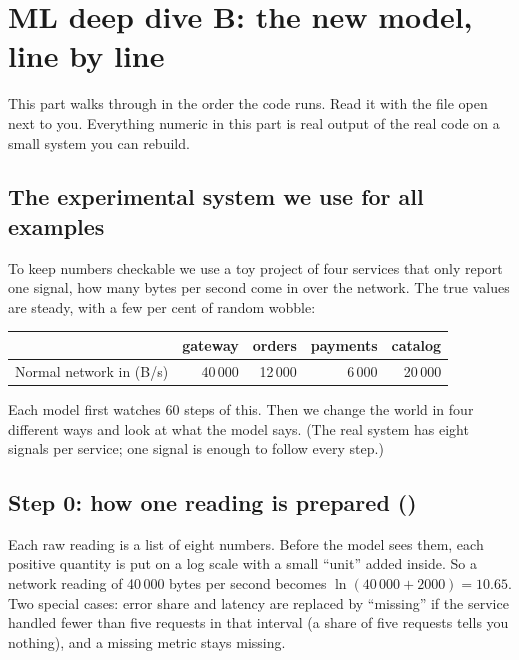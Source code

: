 \chapter{ML deep dive B: the new model, line by line}
\label{ch:deepload}

This part walks through  in the order the code runs. Read it with the file open next to you. Everything numeric in this part is real output of the real code on a small system you can rebuild.

\section{The experimental system we use for all examples}
\begin{simplebox}
To keep numbers checkable we use a toy project of four services that only report one signal, how many bytes per second come in over the network. The true values are steady, with a few per cent of random wobble:

\begin{center}
\small
\begin{tabular}{lrrrr}
\toprule
 & gateway & orders & payments & catalog\\
\midrule
Normal network in (B/s) & 40\,000 & 12\,000 & 6\,000 & 20\,000\\
\bottomrule
\end{tabular}
\end{center}

Each model first watches 60 steps of this. Then we change the world in four different ways and look at what the model says. (The real system has eight signals per service; one signal is enough to follow every step.)
\end{simplebox}

\section{Step 0: how one reading is prepared ()}
\begin{simplebox}
Each raw reading is a list of eight numbers. Before the model sees them, each positive quantity is put on a log scale with a small ``unit'' added inside. So a network reading of 40\,000 bytes per second becomes $\ln(40\,000+2000)=10.65$. Two special cases: error share and latency are replaced by ``missing'' if the service handled fewer than five requests in that interval (a share of five requests tells you nothing), and a missing metric stays missing.
\end{simplebox}

